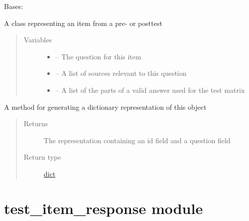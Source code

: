 \documentclass[letterpaper,10pt,english]{sphinxmanual}
\begin{document}
\begin{fulllineitems}
\label{\detokenize{test_item:test_item.TestItem}}
Bases: 

A class representing an item from a pre- or posttest
\begin{quote}\begin{description}
\item[{Variables}] \leavevmode\begin{itemize}
\item {} 
 -- The question for this item

\item {} 
 -- A list of sources relevant to this question

\item {} 
 -- A list of the parts of a valid answer used for the test matrix

\end{itemize}

\end{description}\end{quote}

\begin{fulllineitems}
\label{\detokenize{test_item:test_item.TestItem.to_dict}}
A method for generating a dictionary representation of this object
\begin{quote}\begin{description}
\item[{Returns}] \leavevmode
The representation containing an id field and a question field

\item[{Return type}] \leavevmode
\href{https://docs.python.org/2/library/stdtypes.html\#dict}{dict}

\end{description}\end{quote}

\end{fulllineitems}


\end{fulllineitems}



\section{test\_item\_response module}
\label{\detokenize{test_item_response:test-item-response-module}}\label{\detokenize{test_item_response:module-test_item_response}}\label{\detokenize{test_item_response::doc}}
\end{document}
